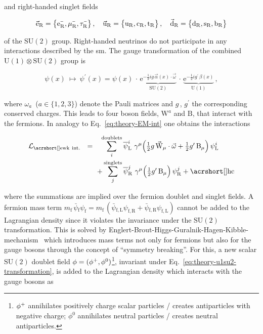 and right-handed singlet fields

\begin{align}
\vec{\mathrm{e}}_\mathrm{R}=\big\{\mathrm{e}^{\rmminus}_\mathrm{R},\mu^{\rmminus}_\mathrm{R},\tau^{\rmminus}_\mathrm{R}\big\}\,,\quad\vec{\mathrm{u}}_\mathrm{R}=\big\{\mathrm{u}_\mathrm{R},\mathrm{c}_\mathrm{R},\mathrm{t}_\mathrm{R}\big\}\,,\quad\vec{\mathrm{d}}_\mathrm{R}=\big\{\mathrm{d}_\mathrm{R},\mathrm{s}_\mathrm{R},\mathrm{b}_\mathrm{R}\big\} \label{eq:theory-su2-singlets}
\end{align}

of the $\mathrm{SU(2)}$ group. Right-handed neutrinos do not participate in any interactions described by the \gls{sm}. The gauge transformation of the combined $\mathrm{U(1)}\otimes \mathrm{SU(2)}$ group is

\begin{equation}
\psi(x)~\mapsto~\psi^\prime(x)=\psi(x)\,\cdot\,\underbrace{\mathrm{e}^{-\tfrac{1}{2}ig\,\vec{\alpha}(x)\cdot\vec{\omega}}}_\mathrm{SU(2)}\,\cdot\,\underbrace{\mathrm{e}^{-\tfrac{1}{2}ig^{\prime}\,\beta(x)}}_\mathrm{U(1)}\,, \label{eq:theory-u1su2-transformation}
\end{equation}

where $\omega_{a}$~($a\in\{1,2,3\}$) denote the Pauli matrices and $g$\,, $g^{\prime}$ the corresponding conserved charges. This leads to four boson fields, $\mathrm{W}^{a}$ and $\mathrm{B}$, that interact with the fermions. In analogy to Eq.~\ref{eq:theory-EM-int} one obtains the  interactions

\begin{align}
\mathcal{L}_\mathrm{\gls{ewk}~ int.}~~=\hphantom{+}\sum_{i}^\mathrm{doublets}\,&\bar{\psi}^{i}_\mathrm{L}~\gamma^{\mu}\Big(\tfrac{1}{2}g\,\vec{\mathrm{W}}_{\mu}\cdot\vec{\omega}+\tfrac{1}{2}g^{\prime}\,\mathrm{B}_{\mu}\Big)\,\psi^{i}_\mathrm{L} \nonumber\\
+\sum_{j}^\mathrm{singlets}\,&\bar{\psi}^{j}_\mathrm{R}~\gamma^{\mu}\Big(\tfrac{1}{2}g^{\prime}\,\mathrm{B}_{\mu}\Big)\,\psi^{j}_\mathrm{R} + \mathrm{\gls{hc}} \label{eq:theory-codev-su2-interaction}
\end{align}

where the summations are implied over the fermion doublet and singlet fields. A fermion mass term $ m_\mathrm{f}\,\bar{\psi}{}_\mathrm{f}\psi_\mathrm{f}=m_\mathrm{f}\,(\bar{\psi}{}_\mathrm{f,L}\psi_\mathrm{f,R}+\bar{\psi}{}_\mathrm{f,R}\psi_\mathrm{f,L})$ cannot be added to the Lagrangian density since it violates the invariance under the $\mathrm{SU(2)}$ transformation. This is solved by Englert-Brout-Higgs-Guralnik-Hagen-Kibble-mechanism~\cite{HIGGS1964132,PhysRevLett.13.508,PhysRevLett.13.321,PhysRevLett.13.585} which introduces mass terms not only for fermions but also for the gauge bosons through the concept of ``symmetry breaking''. For this, a new scalar $\mathrm{SU(2)}$ doublet field $\phi=(\phi^{+},\phi^{0})$\footnote{$\phi^{+}$ annihilates positively charge scalar particles / creates antiparticles with negative charge; $\phi^{0}$ annihilates neutral particles / creates neutral antiparticles.}, invariant under Eq.~\ref{eq:theory-u1su2-transformation}, is added to the Lagrangian density which interacts with the gauge bosons as

